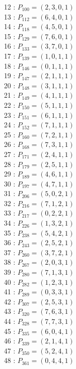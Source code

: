 \documentclass{article}
\begin{document}
{\begin{multicols}{3}
12 : $P_{100}=( 2, 3, 0, 1 )$\\
13 : $P_{112}=( 6, 4, 0, 1 )$\\
14 : $P_{118}=( 4, 5, 0, 1 )$\\
15 : $P_{129}=( 7, 6, 0, 1 )$\\
16 : $P_{133}=( 3, 7, 0, 1 )$\\
17 : $P_{139}=( 1, 0, 1, 1 )$\\
18 : $P_{146}=( 0, 1, 1, 1 )$\\
19 : $P_{147}=( 2, 1, 1, 1 )$\\
20 : $P_{148}=( 3, 1, 1, 1 )$\\
21 : $P_{149}=( 4, 1, 1, 1 )$\\
22 : $P_{150}=( 5, 1, 1, 1 )$\\
23 : $P_{151}=( 6, 1, 1, 1 )$\\
24 : $P_{152}=( 7, 1, 1, 1 )$\\
25 : $P_{160}=( 7, 2, 1, 1 )$\\
26 : $P_{168}=( 7, 3, 1, 1 )$\\
27 : $P_{171}=( 2, 4, 1, 1 )$\\
28 : $P_{179}=( 2, 5, 1, 1 )$\\
29 : $P_{189}=( 4, 6, 1, 1 )$\\
30 : $P_{197}=( 4, 7, 1, 1 )$\\
31 : $P_{206}=( 5, 0, 2, 1 )$\\
32 : $P_{216}=( 7, 1, 2, 1 )$\\
33 : $P_{217}=( 0, 2, 2, 1 )$\\
34 : $P_{226}=( 1, 3, 2, 1 )$\\
35 : $P_{238}=( 5, 4, 2, 1 )$\\
36 : $P_{243}=( 2, 5, 2, 1 )$\\
37 : $P_{260}=( 3, 7, 2, 1 )$\\
38 : $P_{267}=( 2, 0, 3, 1 )$\\
39 : $P_{280}=( 7, 1, 3, 1 )$\\
40 : $P_{282}=( 1, 2, 3, 1 )$\\
41 : $P_{289}=( 0, 3, 3, 1 )$\\
42 : $P_{307}=( 2, 5, 3, 1 )$\\
43 : $P_{320}=( 7, 6, 3, 1 )$\\
44 : $P_{328}=( 7, 7, 3, 1 )$\\
45 : $P_{335}=( 6, 0, 4, 1 )$\\
46 : $P_{339}=( 2, 1, 4, 1 )$\\
47 : $P_{350}=( 5, 2, 4, 1 )$\\
48 : $P_{361}=( 0, 4, 4, 1 )$\\

\end{multicols}}
\end{document}
